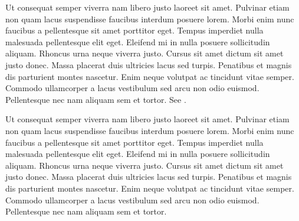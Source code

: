 
 Ut consequat semper viverra nam libero justo laoreet sit amet. Pulvinar etiam non quam lacus suspendisse faucibus interdum posuere lorem. Morbi enim nunc faucibus a pellentesque sit amet porttitor eget. Tempus imperdiet nulla malesuada pellentesque elit eget. Eleifend mi in nulla posuere sollicitudin aliquam. Rhoncus urna neque viverra justo. Cursus sit amet dictum sit amet justo donec. Massa placerat duis ultricies lacus sed turpis. Penatibus et magnis dis parturient montes nascetur. Enim neque volutpat ac tincidunt vitae semper. Commodo ullamcorper a lacus vestibulum sed arcu non odio euismod. Pellentesque nec nam aliquam sem et tortor.  See .

 Ut consequat semper viverra nam libero justo laoreet sit amet. Pulvinar etiam non quam lacus suspendisse faucibus interdum posuere lorem. Morbi enim nunc faucibus a pellentesque sit amet porttitor eget. Tempus imperdiet nulla malesuada pellentesque elit eget. Eleifend mi in nulla posuere sollicitudin aliquam. Rhoncus urna neque viverra justo. Cursus sit amet dictum sit amet justo donec. Massa placerat duis ultricies lacus sed turpis. Penatibus et magnis dis parturient montes nascetur. Enim neque volutpat ac tincidunt vitae semper. Commodo ullamcorper a lacus vestibulum sed arcu non odio euismod. Pellentesque nec nam aliquam sem et tortor.
